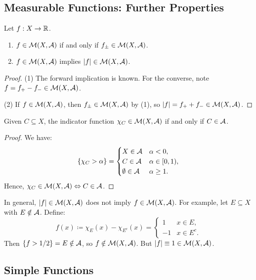 \subsection{Measurable Functions: Further Properties}

\begin{corollary}
Let $f:X \to \mathbb{R}$.
\begin{enumerate}
    \item $f \in \mathcal{M}(X,\mathcal{A})$ if and only if $f_{\pm} \in \mathcal{M}(X,\mathcal{A})$.
    \item $f \in \mathcal{M}(X,\mathcal{A})$ implies $|f| \in \mathcal{M}(X,\mathcal{A})$.
\end{enumerate}
\end{corollary}

\begin{proof}
(1) The forward implication is known. For the converse, note $f = f_+ - f_- \in \mathcal{M}(X,\mathcal{A})$.

(2) If $f \in \mathcal{M}(X,\mathcal{A})$, then $f_{\pm} \in \mathcal{M}(X,\mathcal{A})$ by (1), so $|f| = f_+ + f_- \in \mathcal{M}(X,\mathcal{A})$.
\end{proof}

\clearpage
\begin{lemma}
Given $C \subseteq X$, the indicator function $\chi_C \in \mathcal{M}(X,\mathcal{A})$ if and only if $C \in \mathcal{A}$.
\end{lemma}

\begin{proof}
We have:
\[
\{\chi_C > \alpha\} = 
\begin{cases}
X \in \mathcal{A} & \alpha < 0, \\
C \in \mathcal{A} & \alpha \in [0,1), \\
\emptyset \in \mathcal{A} & \alpha \geq 1.
\end{cases}
\]
Hence, $\chi_C \in \mathcal{M}(X,\mathcal{A}) \Leftrightarrow C \in \mathcal{A}$.
\end{proof}

\begin{remark}
In general, $|f| \in \mathcal{M}(X,\mathcal{A})$ does not imply $f \in \mathcal{M}(X,\mathcal{A})$.
For example, let $E \subseteq X$ with $E \notin \mathcal{A}$.
Define:
\[
f(x) \coloneqq \chi_E(x) - \chi_{E^c}(x) = 
\begin{cases}
1 & x \in E, \\
-1 & x \in E^c.
\end{cases}
\]
Then $\{f > 1/2\} = E \notin \mathcal{A}$, so $f \notin \mathcal{M}(X,\mathcal{A})$.
But $|f| \equiv 1 \in \mathcal{M}(X,\mathcal{A})$.
\end{remark}

\subsection{Simple Functions}

